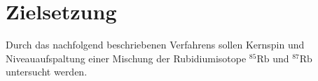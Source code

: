\section{Zielsetzung}
\label{sec:zielsetzung}

Durch das nachfolgend beschriebenen Verfahrens sollen Kernspin und Niveauaufspaltung einer Mischung der Rubidiumisotope
$^{85}\text{Rb}$ und $^{87}\text{Rb}$ untersucht werden.
